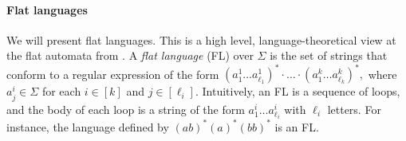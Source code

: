 





\paragraph{Flat languages}


We will present flat languages. This is a high level, language-theoretical view at the flat automata from \cite{Parosh:20:PLDI}. 
%
A \emph{flat language} (FL)  over $\Sigma$
is the set of strings 
that conform to a regular expression of the form
$
(a^1_1\ldots a^1_{\ell_1})^* \cdot \ldots \cdot (a^k_1\ldots a^k_{\ell_k})^*, 
$
where $a^i_j \in \Sigma$ for each $i \in [k]$ and $j \in [\ell_i]$.
Intuitively, an FL is a  sequence of loops,  and the body of each loop is a string of the form  $a^i_1\ldots a^i_{\ell_i}$ with $\ell_i$ letters. 
For instance, the language defined by $(ab)^*(a)^*(bb)^*$ is an FL.




